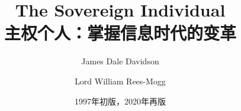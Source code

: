 \documentclass[fontset=none, punct=kaiming]{ctexbook}
\begin{document}
\title{\Huge{\textbf{The Sovereign Individual}}\\ \large{主权个人：掌握信息时代的变革}}
\author{James Dale Davidson
	\and Lord William Rees-Mogg}
\date{1997年初版，2020年再版}


\maketitle
\thispagestyle{empty} 	%

\pagestyle{empty}


\renewcommand\contentsname{目录} %
\tableofcontents %
\pagestyle{empty} %

\newpage
\mainmatter
\pagestyle{headings} %
\end{document}
